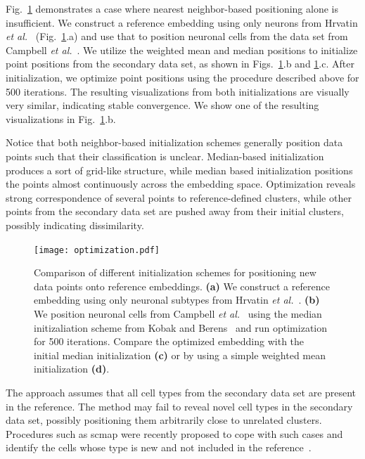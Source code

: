 \documentclass[runningheads]{llncs}
\newcommand{\etal}{\textit{et al.}}
\begin{document}
Fig.~\ref{fig:optimization} demonstrates a case where nearest neighbor-based 
positioning alone is insufficient. We construct a reference embedding using only
neurons from Hrvatin \etal~\cite{Hrvatin2018} (Fig.~\ref{fig:optimization}.a)
and use that to position neuronal
cells from the data set from Campbell \etal~\cite{Campbell2017}. We utilize the
weighted mean and median positions to initialize point positions from the secondary
data set, as shown in Figs.~\ref{fig:optimization}.b and \ref{fig:optimization}.c.
After initialization, we optimize point positions using the procedure described
above for 500 iterations. The resulting visualizations from both initializations
are visually very similar, indicating stable convergence. We show one of the resulting
visualizations in Fig.~\ref{fig:optimization}.b.

Notice that both neighbor-based initialization schemes generally position data points
such that their classification is unclear. Median-based initialization produces
a sort of grid-like structure, while median based initialization positions the points
almost continuously across the embedding space. Optimization reveals strong
correspondence of several points to reference-defined clusters, while other points
from the secondary data set are pushed away from their initial clusters, possibly
indicating dissimilarity.


\begin{figure}[htbp]
  \texttt{[image: optimization.pdf]}
  \caption{Comparison of different initialization schemes for positioning new data
  points onto reference embeddings. {\bf (a)} We construct a reference embedding
  using only neuronal subtypes from Hrvatin \etal~\cite{Hrvatin2018}. {\bf (b)}
  We position neuronal cells from Campbell \etal~\cite{Campbell2017} using the
  median initizaliation scheme from Kobak and Berens~\cite{Kobak2019} and
  run optimization for 500 iterations. Compare the optimized embedding with the 
  initial median initialization {\bf (c)} or by using a simple weighted mean
  initialization {\bf (d)}.}
  \label{fig:optimization}
\end{figure}

The approach assumes that all cell types from the secondary data set are
present in the reference. The method may fail to reveal novel cell
types in the secondary data set, possibly positioning them arbitrarily close to
unrelated clusters. Procedures such as scmap were recently proposed to cope
with such cases and identify the cells whose type is new and not included in
the reference~\cite{Kiselev2018}.
\end{document}
